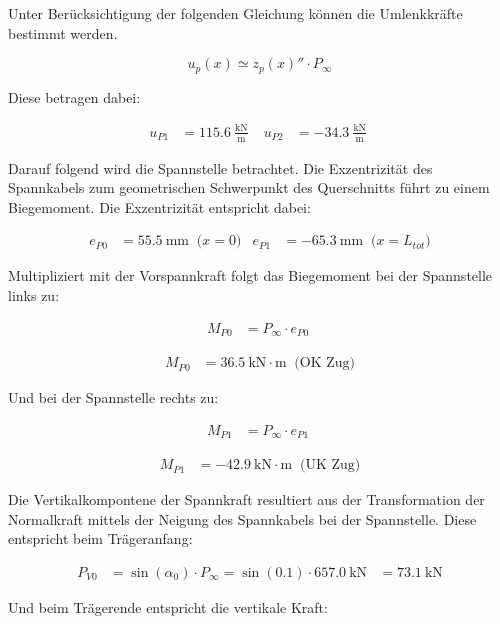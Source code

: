 \documentclass[
  11pt,
  letterpaper,
]{scrreprt}
\begin{document}
Unter Berücksichtigung der folgenden Gleichung können die Umlenkkräfte
bestimmt werden.

\[
u_p(x) \simeq z_p(x)'' \cdot P_{\infty}
\]

Diese betragen dabei:

$$
\begin{aligned}
u_{P1} &= 115.6\ \frac{\mathrm{kN}}{\mathrm{m}} \; 
 &u_{P2} &= -34.3\ \frac{\mathrm{kN}}{\mathrm{m}} \;
\end{aligned}
$$

Darauf folgend wird die Spannstelle betrachtet. Die Exzentrizität des
Spannkabels zum geometrischen Schwerpunkt des Querschnitts führt zu
einem Biegemoment. Die Exzentrizität entspricht dabei:

$$
\begin{aligned}
e_{P0} &= 55.5\ \mathrm{mm} \; \;\textrm{($x=0$)}
 &e_{P1} &= -65.3\ \mathrm{mm} \; \;\textrm{($x=L_{tot}$)}
\end{aligned}
$$

Multipliziert mit der Vorspannkraft folgt das Biegemoment bei der
Spannstelle links zu:

$$
\begin{aligned}
M_{P0} &= P_{\infty} \cdot e_{P0} \; 
\end{aligned}
$$

$$
\begin{aligned}
M_{P0} &= 36.5\ \mathrm{kN} \cdot \mathrm{m} \; \;\textrm{(OK Zug)}
\end{aligned}
$$

Und bei der Spannstelle rechts zu:

$$
\begin{aligned}
M_{P1} &= P_{\infty} \cdot e_{P1} \; 
\end{aligned}
$$

$$
\begin{aligned}
M_{P1} &= -42.9\ \mathrm{kN} \cdot \mathrm{m} \; \;\textrm{(UK Zug)}
\end{aligned}
$$

Die Vertikalkompontene der Spannkraft resultiert aus der Transformation
der Normalkraft mittels der Neigung des Spannkabels bei der Spannstelle.
Diese entspricht beim Trägeranfang:

$$
\begin{aligned}
P_{V0} &= \sin \left( \alpha_{0} \right) \cdot P_{\infty}  = \sin \left( 0.1 \right) \cdot 657.0\ \mathrm{kN} &= 73.1\ \mathrm{kN}  
\end{aligned}
$$

Und beim Trägerende entspricht die vertikale Kraft:
\end{document}
